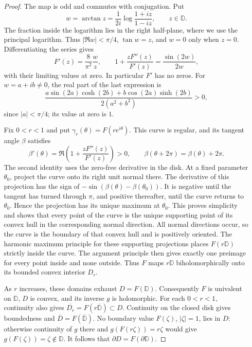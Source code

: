 \begin{proof}
The map is odd and commutes with conjugation. Put
\[
 w=\arctan z=\frac1{2i}\log\frac{1+iz}{1-iz},\qquad z\in\mathbb{D}.
\]
The fraction inside the logarithm lies in the right half-plane, where we use the principal logarithm. Thus $|\Re w|<\pi/4$, $\tan w=z$, and $w=0$ only when $z=0$. Differentiating the series gives
\begin{equation}\label{eq:lens-derivatives}
 F'(z)=\frac8{\pi^2}\frac wz,\qquad
 1+\frac{zF''(z)}{F'(z)}=\frac{\sin(2w)}{2w},
\end{equation}
with their limiting values at zero. In particular $F'$ has no zeros. For $w=a+ib\ne0$, the real part of the last expression is
\[
 \frac{a\sin(2a)\cosh(2b)+b\cos(2a)\sinh(2b)}{2(a^2+b^2)}>0,
\]
since $|a|<\pi/4$; its value at zero is $1$.

Fix $0<r<1$ and put $\gamma_r(\theta)=F(re^{i\theta})$. This curve is regular, and its tangent angle $\beta$ satisfies
\[
 \beta'(\theta)=\Re\!\left(1+\frac{zF''(z)}{F'(z)}\right)>0,
 \qquad \beta(\theta+2\pi)=\beta(\theta)+2\pi.
\]
The second identity uses the zero-free derivative in the disk. At a fixed parameter $\theta_0$, project the curve onto its right unit normal there. The derivative of this projection has the sign of $-\sin(\beta(\theta)-\beta(\theta_0))$. It is negative until the tangent has turned through $\pi$, and positive thereafter, until the curve returns to $\theta_0$. Hence the projection has its unique maximum at $\theta_0$. This proves simplicity and shows that every point of the curve is the unique supporting point of its convex hull in the corresponding normal direction. All normal directions occur, so the curve is the boundary of that convex hull and is positively oriented. The harmonic maximum principle for these supporting projections places $F(r\mathbb{D})$ strictly inside the curve. The argument principle then gives exactly one preimage for every point inside and none outside. Thus $F$ maps $r\mathbb{D}$ biholomorphically onto its bounded convex interior $D_r$.

As $r$ increases, these domains exhaust $D=F(\mathbb{D})$. Consequently $F$ is univalent on $\mathbb{D}$, $D$ is convex, and its inverse $g$ is holomorphic. For each $0<r<1$, continuity also gives $\overline{D_r}=F(r\overline{\mathbb{D}})\subset D$. Continuity on the closed disk gives boundedness and $\overline D=F(\overline{\mathbb{D}})$. No boundary value $F(\zeta)$, $|\zeta|=1$, lies in $D$: otherwise continuity of $g$ there and $g(F(r\zeta))=r\zeta$ would give $g(F(\zeta))=\zeta\notin\mathbb{D}$. It follows that $\partial D=F(\partial\mathbb{D})$.


\end{proof}
